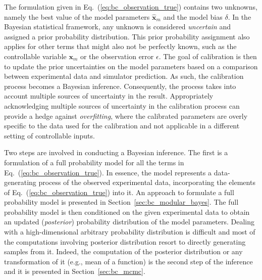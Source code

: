 The formulation given in Eq.~(\ref{eq:bc_observation_true}) contains two unknowns, namely the best value of the model parameters $\hat{\bm{x}}_m$ and the model bias $\delta$.
In the Bayesian statistical framework, any unknown is considered \emph{uncertain} and assigned a prior probability distribution.
This prior probability assignment also applies for other terms that might also not be perfectly known, such as the controllable variable $\bm{x}_m$ or the observation error $\epsilon$. 
The goal of calibration is then to update the prior uncertainties on the model parameters based on a comparison between experimental data and simulator prediction.
As such, the calibration process becomes a Bayesian inference.
Consequently, the process takes into account multiple sources of uncertainty in the result.
Appropriately acknowledging multiple sources of uncertainty in the calibration process can provide a hedge against \emph{overfitting}, where the calibrated parameters are overly specific to the data used for the calibration and not applicable in a different setting of controllable inputs.

Two steps are involved in conducting a Bayesian inference.
The first is a formulation of a full probability model for all the terms in Eq.~(\ref{eq:bc_observation_true}).
In essence, the model represents a data-generating process of the observed experimental data,
incorporating the elements of Eq.~(\ref{eq:bc_observation_true}) into it.
An approach to formulate a full probability model is presented in Section~\ref{sec:bc_modular_bayes}.
The full probability model is then conditioned on the given experimental data to obtain an updated (\emph{posterior}) probability distribution of the model parameters.
Dealing with a high-dimensional arbitrary probability distribution is difficult and most of the computations involving  posterior distribution resort to directly generating samples from it. 
Indeed, the computation of the posterior distribution or any transformation of it (e.g., mean of a function) is the second step of the inference and it is presented in Section~\ref{sec:bc_mcmc}.
